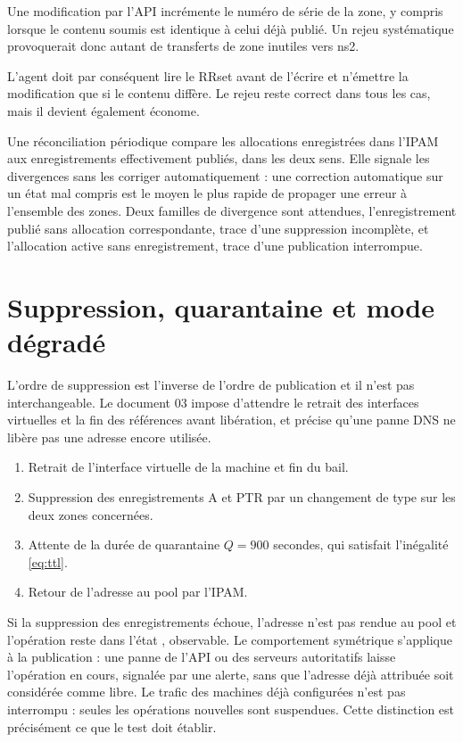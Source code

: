 \begin{encadre}
Une modification par l'API incrémente le numéro de série de la zone, y compris
lorsque le contenu soumis est identique à celui déjà publié. Un rejeu
systématique provoquerait donc autant de transferts de zone inutiles vers ns2.

\smallskip
L'agent doit par conséquent lire le RRset avant de l'écrire et n'émettre la
modification que si le contenu diffère. Le rejeu reste correct dans tous les
cas, mais il devient également économe.
\end{encadre}

Une réconciliation périodique compare les allocations enregistrées dans l'IPAM
aux enregistrements effectivement publiés, dans les deux sens. Elle signale les
divergences sans les corriger automatiquement : une correction automatique sur
un état mal compris est le moyen le plus rapide de propager une erreur à
l'ensemble des zones. Deux familles de divergence sont attendues,
l'enregistrement publié sans allocation correspondante, trace d'une suppression
incomplète, et l'allocation active sans enregistrement, trace d'une publication
interrompue.

\section{Suppression, quarantaine et mode dégradé}
\label{sec:suppression}

L'ordre de suppression est l'inverse de l'ordre de publication et il n'est pas
interchangeable. Le document 03 impose d'attendre le retrait des interfaces
virtuelles et la fin des références avant libération, et précise qu'une panne
DNS ne libère pas une adresse encore utilisée.

\begin{enumerate}
  \item Retrait de l'interface virtuelle de la machine et fin du bail.
  \item Suppression des enregistrements A et PTR par un changement de type
     sur les deux zones concernées.
  \item Attente de la durée de quarantaine $Q = 900$ secondes, qui satisfait
    l'inégalité \eqref{eq:ttl}.
  \item Retour de l'adresse au pool par l'IPAM.
\end{enumerate}

Si la suppression des enregistrements échoue, l'adresse n'est pas rendue au pool
et l'opération reste dans l'état , observable. Le comportement
symétrique s'applique à la publication : une panne de l'API ou des serveurs
autoritatifs laisse l'opération en cours, signalée par une alerte, sans que
l'adresse déjà attribuée soit considérée comme libre. Le trafic des machines
déjà configurées n'est pas interrompu : seules les opérations nouvelles sont
suspendues. Cette distinction est précisément ce que le test  doit
établir.

